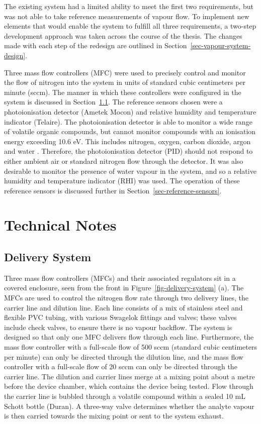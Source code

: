 \documentclass[
  a4paper,
]{scrbook}
\begin{document}
The existing system had a limited ability to meet the first two
requirements, but was not able to take reference measurements of vapour
flow. To implement new elements that would enable the system to fulfill
all three requirements, a two-step development approach was taken across
the course of the thesis. The changes made with each step of the
redesign are outlined in Section~\ref{sec-vapour-system-design}.

Three mass flow controllers (MFC) were used to precisely control and
monitor the flow of nitrogen into the system in units of standard cubic
centimeters per minute (sccm). The manner in which these controllers
were configured in the system is discussed in
Section~\ref{sec-delivery-system}. The reference sensors chosen were a
photoionisation detector (Ametek Mocon) and relative humidity and
temperature indicator (Telaire). The photoionisation detector is able to
monitor a wide range of volatile organic compounds, but cannot monitor
compounds with an ionisation energy exceeding 10.6 eV. This includes
nitrogen, oxygen, carbon dioxide, argon and water
\autocite{PIDmanual,Ionscience}. Therefore, the photoionisation detector
(PID) should not respond to either ambient air or standard nitrogen flow
through the detector. It was also desirable to monitor the presence of
water vapour in the system, and so a relative humidity and temperature
indicator (RHI) was used. The operation of these reference sensors is
discussed further in Section~\ref{sec-reference-sensors}.

\hypertarget{technical-notes}{%
\section{Technical Notes}\label{technical-notes}}

\hypertarget{sec-delivery-system}{%
\subsection{Delivery System}\label{sec-delivery-system}}

Three mass flow controllers (MFCs) and their associated regulators sit
in a covered enclosure, seen from the front in
Figure~\ref{fig-delivery-system} (a). The MFCs are used to control the
nitrogen flow rate through two delivery lines, the carrier line and
dilution line. Each line consists of a mix of stainless steel and
flexible PVC tubing, with various Swagelok fittings and valves; these
valves include check valves, to ensure there is no vapour backflow. The
system is designed so that only one MFC delivers flow through each line.
Furthermore, the mass flow controller with a full-scale flow of 500 sccm
(standard cubic centimeters per minute) can only be directed through the
dilution line, and the mass flow controller with a full-scale flow of 20
sccm can only be directed through the carrier line. The dilution and
carrier lines merge at a mixing point about a metre before the device
chamber, which contains the device being tested. Flow through the
carrier line is bubbled through a volatile compound within a sealed 10
mL Schott bottle (Duran). A three-way valve determines whether the
analyte vapour is then carried towards the mixing point or sent to the
system exhaust.
\end{document}
